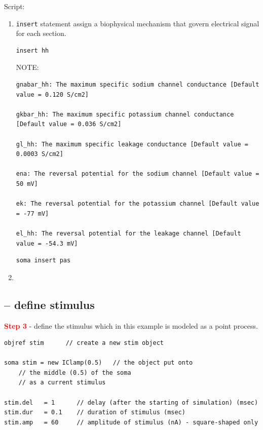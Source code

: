 Script: 
\begin{enumerate}
  \item \verb!insert! statement assign a biophysical mechanism that govern
  electrical signal for each section.

\begin{verbatim}
insert hh
\end{verbatim}  

NOTE:
\begin{verbatim}
gnabar_hh: The maximum specific sodium channel conductance [Default value = 0.120 S/cm2]

gkbar_hh: The maximum specific potassium channel conductance [Default value = 0.036 S/cm2]

gl_hh: The maximum specific leakage conductance [Default value = 0.0003 S/cm2]

ena: The reversal potential for the sodium channel [Default value = 50 mV]

ek: The reversal potential for the potassium channel [Default value = -77 mV]

el_hh: The reversal potential for the leakage channel [Default value = -54.3 mV]
\end{verbatim}

\begin{verbatim}
soma insert pas
\end{verbatim}

  \item 
\end{enumerate}


\subsection{-- define stimulus}

\textcolor{red}{\bf Step 3} - define the stimulus which in this example is
modeled as a point process.

\begin{verbatim}
objref stim      // create a new stim object

soma stim = new IClamp(0.5)   // the object put onto 
    // the middle (0.5) of the soma 
    // as a current stimulus

stim.del   = 1      // delay (after the starting of simulation) (msec)
stim.dur   = 0.1    // duration of stimulus (msec)
stim.amp   = 60     // amplitude of stimulus (nA) - square-shaped only
\end{verbatim}

